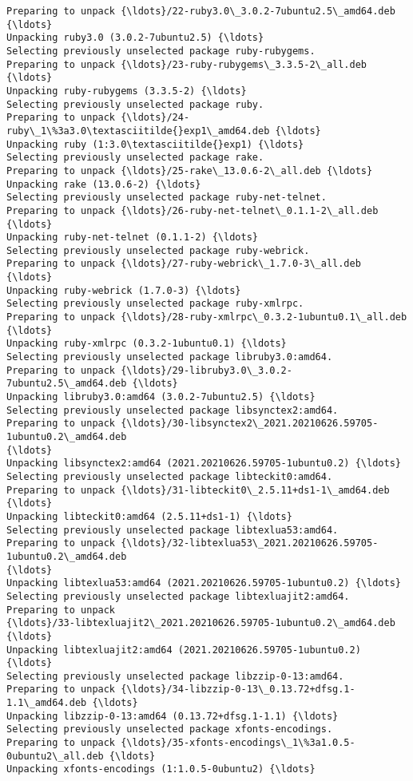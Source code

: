 \documentclass[11pt]{article}
\begin{document}
\begin{Verbatim}[commandchars=\\\{\}]
Preparing to unpack {\ldots}/22-ruby3.0\_3.0.2-7ubuntu2.5\_amd64.deb {\ldots}
Unpacking ruby3.0 (3.0.2-7ubuntu2.5) {\ldots}
Selecting previously unselected package ruby-rubygems.
Preparing to unpack {\ldots}/23-ruby-rubygems\_3.3.5-2\_all.deb {\ldots}
Unpacking ruby-rubygems (3.3.5-2) {\ldots}
Selecting previously unselected package ruby.
Preparing to unpack {\ldots}/24-ruby\_1\%3a3.0\textasciitilde{}exp1\_amd64.deb {\ldots}
Unpacking ruby (1:3.0\textasciitilde{}exp1) {\ldots}
Selecting previously unselected package rake.
Preparing to unpack {\ldots}/25-rake\_13.0.6-2\_all.deb {\ldots}
Unpacking rake (13.0.6-2) {\ldots}
Selecting previously unselected package ruby-net-telnet.
Preparing to unpack {\ldots}/26-ruby-net-telnet\_0.1.1-2\_all.deb {\ldots}
Unpacking ruby-net-telnet (0.1.1-2) {\ldots}
Selecting previously unselected package ruby-webrick.
Preparing to unpack {\ldots}/27-ruby-webrick\_1.7.0-3\_all.deb {\ldots}
Unpacking ruby-webrick (1.7.0-3) {\ldots}
Selecting previously unselected package ruby-xmlrpc.
Preparing to unpack {\ldots}/28-ruby-xmlrpc\_0.3.2-1ubuntu0.1\_all.deb {\ldots}
Unpacking ruby-xmlrpc (0.3.2-1ubuntu0.1) {\ldots}
Selecting previously unselected package libruby3.0:amd64.
Preparing to unpack {\ldots}/29-libruby3.0\_3.0.2-7ubuntu2.5\_amd64.deb {\ldots}
Unpacking libruby3.0:amd64 (3.0.2-7ubuntu2.5) {\ldots}
Selecting previously unselected package libsynctex2:amd64.
Preparing to unpack {\ldots}/30-libsynctex2\_2021.20210626.59705-1ubuntu0.2\_amd64.deb
{\ldots}
Unpacking libsynctex2:amd64 (2021.20210626.59705-1ubuntu0.2) {\ldots}
Selecting previously unselected package libteckit0:amd64.
Preparing to unpack {\ldots}/31-libteckit0\_2.5.11+ds1-1\_amd64.deb {\ldots}
Unpacking libteckit0:amd64 (2.5.11+ds1-1) {\ldots}
Selecting previously unselected package libtexlua53:amd64.
Preparing to unpack {\ldots}/32-libtexlua53\_2021.20210626.59705-1ubuntu0.2\_amd64.deb
{\ldots}
Unpacking libtexlua53:amd64 (2021.20210626.59705-1ubuntu0.2) {\ldots}
Selecting previously unselected package libtexluajit2:amd64.
Preparing to unpack
{\ldots}/33-libtexluajit2\_2021.20210626.59705-1ubuntu0.2\_amd64.deb {\ldots}
Unpacking libtexluajit2:amd64 (2021.20210626.59705-1ubuntu0.2) {\ldots}
Selecting previously unselected package libzzip-0-13:amd64.
Preparing to unpack {\ldots}/34-libzzip-0-13\_0.13.72+dfsg.1-1.1\_amd64.deb {\ldots}
Unpacking libzzip-0-13:amd64 (0.13.72+dfsg.1-1.1) {\ldots}
Selecting previously unselected package xfonts-encodings.
Preparing to unpack {\ldots}/35-xfonts-encodings\_1\%3a1.0.5-0ubuntu2\_all.deb {\ldots}
Unpacking xfonts-encodings (1:1.0.5-0ubuntu2) {\ldots}

\end{Verbatim}
\end{document}
